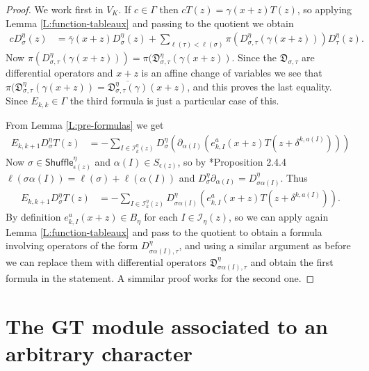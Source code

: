 \documentclass[11pt,fleqn]{article}
\newcommand\DD{\mathfrak D}
\newcommand\I{\mathcal I}
\newcommand\Shuffle{\mathsf{Shuffle}}
\begin{document}
\begin{proof}
We work first in $V_K$. If $c \in \Gamma$ then $c T(z) = \gamma(x+z) T(z)$, so
applying Lemma \ref{L:function-tableaux} and passing to the quotient we obtain
\begin{align*}
c D_\sigma^\eta(z)
	&= \overline \gamma(x+z) D_\sigma^\eta(z) +
		\sum_{\ell(\tau) < \ell(\sigma)} 
			\pi(D_{\sigma, \tau}^\eta(\gamma(x+z))) 
			D_\tau^\eta(z).
\end{align*}
Now $\pi(D_{\sigma, \tau}^\eta(\gamma(x+z))) = \pi(\DD_{\sigma,\tau}^\eta(
\gamma(x+z))$. Since the $\DD_{\sigma,\tau}$ are differential operators and
$x+z$ is an affine change of variables we see that $\pi(\DD_{\sigma,\tau}^\eta
(\gamma(x+z)) = \overline{\DD_{\sigma,\tau}^\eta(\gamma)}(x+z)$, and this 
proves the last equality. Since $E_{k,k} \in \Gamma$ the third formula is just 
a particular case of this.

From Lemma \ref{L:pre-formulas} we get
\begin{align*}
E_{k,k+1} D_\sigma^\eta T(z)
	&= - \sum_{I \in \I_k^\eta(z)} D_\sigma^\eta (\partial_{\alpha(I)} 
		\left(
			e_{k,I}^a(x+z) T(z + \delta^{k,a(I)})
		\right))
\end{align*}
Now $\sigma \in \Shuffle_{\epsilon(z)}^\eta$ and $\alpha(I) \in 
S_{\epsilon(z)}$, so by \cite{BB-coxeter-book}*{Proposition 2.4.4}
$\ell(\sigma \alpha(I)) = \ell(\sigma) + \ell(\alpha(I))$ and
$D_\sigma^\eta \partial_{\alpha(I)} = D^\eta_{\sigma \alpha(I)}$. Thus
\begin{align*}
E_{k,k+1} D_\sigma^\eta T(z)
	&= - \sum_{I \in \I_k^\eta(z)} D_{\sigma\alpha(I)}^\eta  
		\left(
			e_{k,I}^a(x+z) T(z + \delta^{k,a(I)})
		\right).
\end{align*}
By definition $e_{k,I}^a(x+z) \in B_\eta$ for each $I \in \I_\eta(z)$, so
we can apply again Lemma \ref{L:function-tableaux} and pass to the quotient
to obtain a formula involving operators of the form $D_{\sigma\alpha(I), 
\tau}^\eta$, and using a similar argument as before we can replace them with
differential operators $\DD_{\sigma\alpha(I), \tau}^\eta$ and obtain the 
first formula in the statement. A simmilar proof works for the second one.
\end{proof}

\section{The GT module associated to an arbitrary character}
\end{document}
